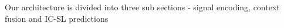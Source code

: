 Our architecture is divided into three sub sections - signal encoding, context fusion and IC-SL predictions


%







